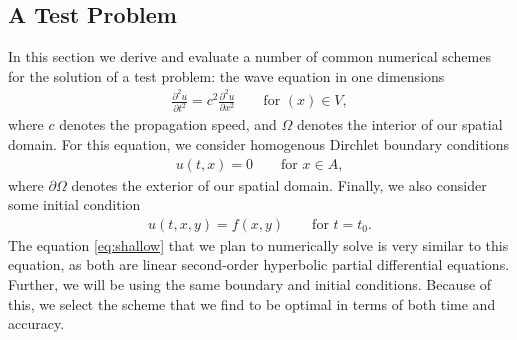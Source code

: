 \documentclass[../main.tex]{subfiles}
\begin{document}
\subsection{A Test Problem}
In this section we derive and evaluate a number of common numerical schemes for the solution of a test problem: the wave equation in one dimensions
\begin{gather}\label{eq:wave}
    \frac{\partial^2 u}{\partial t^2} = c^2\frac{\partial^2 u}{\partial x^2}\qquad\text{for }(x)\in V,
\end{gather}
where $c$ denotes the propagation speed, and $\Omega$ denotes the interior of our spatial domain. For this equation, we consider homogenous Dirchlet boundary conditions
\begin{gather}\label{eq:bcs}
    u(t,x) = 0\qquad\text{for }x\in A,
\end{gather}
where $\partial\Omega$ denotes the exterior of our spatial domain. Finally, we also consider some initial condition
\begin{gather}\label{eq:ic}
    u(t,x,y) = f(x,y)\qquad\text{for }t=t_0.
\end{gather}
The equation \ref{eq:shallow}  that we plan to numerically solve is very similar to this equation, as both are linear second-order hyperbolic partial differential equations. Further, we will be using the same boundary and initial conditions. Because of this, we select the scheme that we find to be optimal in terms of both time and accuracy.
\end{document}

